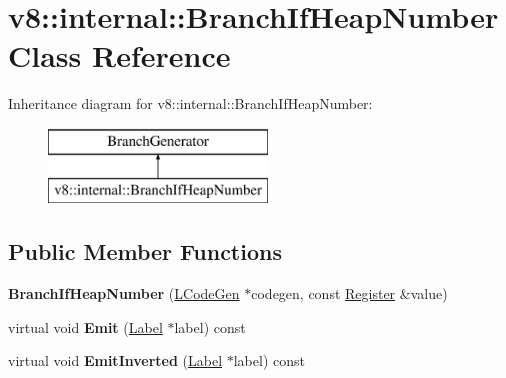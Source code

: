 \hypertarget{classv8_1_1internal_1_1_branch_if_heap_number}{}\section{v8\+:\+:internal\+:\+:Branch\+If\+Heap\+Number Class Reference}
\label{classv8_1_1internal_1_1_branch_if_heap_number}
Inheritance diagram for v8\+:\+:internal\+:\+:Branch\+If\+Heap\+Number\+:\begin{figure}[H]
\begin{center}
\leavevmode
\includegraphics[height=2.000000cm]{classv8_1_1internal_1_1_branch_if_heap_number}
\end{center}
\end{figure}
\subsection*{Public Member Functions}
\begin{DoxyCompactItemize}
\item 
{\bfseries Branch\+If\+Heap\+Number} (\hyperlink{classv8_1_1internal_1_1_l_code_gen}{L\+Code\+Gen} $\ast$codegen, const \hyperlink{structv8_1_1internal_1_1_register}{Register} \&value)\hypertarget{classv8_1_1internal_1_1_branch_if_heap_number_ac871e65a154407ed48cd42d8cae77690}{}\label{classv8_1_1internal_1_1_branch_if_heap_number_ac871e65a154407ed48cd42d8cae77690}

\item 
virtual void {\bfseries Emit} (\hyperlink{classv8_1_1internal_1_1_label}{Label} $\ast$label) const \hypertarget{classv8_1_1internal_1_1_branch_if_heap_number_aebf08ac71a074210713f25eb96856568}{}\label{classv8_1_1internal_1_1_branch_if_heap_number_aebf08ac71a074210713f25eb96856568}

\item 
virtual void {\bfseries Emit\+Inverted} (\hyperlink{classv8_1_1internal_1_1_label}{Label} $\ast$label) const \hypertarget{classv8_1_1internal_1_1_branch_if_heap_number_a0afdd8fccb760e94d2b80eb130400c8a}{}\label{classv8_1_1internal_1_1_branch_if_heap_number_a0afdd8fccb760e94d2b80eb130400c8a}

\end{DoxyCompactItemize}
